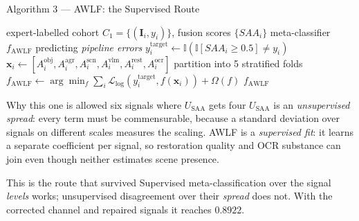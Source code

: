 \documentclass[aspectratio=169,11pt]{beamer}
\begin{document}
\begin{frame}{Algorithm 3 --- AWLF: the Supervised Route}
\tiny
\begin{algorithmic}[1]
\Require expert-labelled cohort $C_1 = \{(\mathbf{I}_i, y_i)\}$, fusion scores $\{SAA_i\}$
\Ensure meta-classifier $f_{\text{AWLF}}$ predicting \emph{pipeline errors}
  \State $y^{\text{target}}_i \leftarrow \mathbb{I}(\mathbb{I}[SAA_i \ge 0.5] \ne y_i)$ 
  \State $\mathbf{x}_i \leftarrow [A^{\text{obj}}_i, A^{\text{agr}}_i, A^{\text{scn}}_i, A^{\text{vlm}}_i, A^{\text{rest}}_i, A^{\text{ocr}}_i]$ 
\EndFor
\State partition into 5 stratified folds
\State $f_{\text{AWLF}} \leftarrow \arg\min_f \sum_i \mathcal{L}_{\text{log}}(y^{\text{target}}_i, f(\mathbf{x}_i)) + \Omega(f)$ 
\State \Return $f_{\text{AWLF}}$ 
\end{algorithmic}
\vspace{1mm}
\begin{block}{\scriptsize Why this one is allowed six signals where $U_{\text{SAA}}$ gets four}
\scriptsize $U_{\text{SAA}}$ is an \emph{unsupervised spread}: every term must be commensurable, because a standard deviation over signals on different scales measures the scaling. AWLF is a \emph{supervised fit}: it learns a separate coefficient per signal, so restoration quality and OCR substance can join even though neither estimates scene presence.
\end{block}
\vspace{-1mm}
\begin{exampleblock}{\scriptsize This is the route that survived}
\scriptsize Supervised meta-classification over the signal \emph{levels} works; unsupervised disagreement over their \emph{spread} does not. With the corrected channel and repaired signals it reaches $\mathbf{0.8922}$.
\end{exampleblock}
\end{frame}
\end{document}

